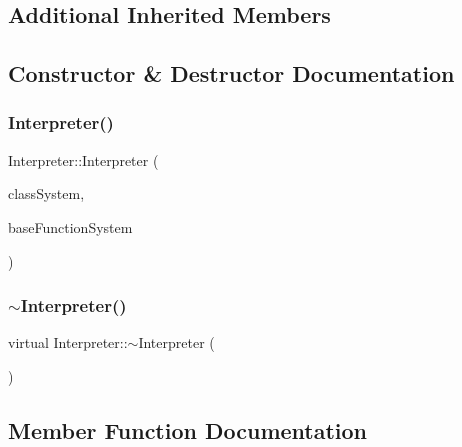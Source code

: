 \subsection*{Additional Inherited Members}


\subsection{Constructor \& Destructor Documentation}
\mbox{\label{classInterpreter_af4a885b059b6af440882047e8406bc9c}} 
\subsubsection{\texorpdfstring{Interpreter()}{Interpreter()}}
{\footnotesize\ttfamily Interpreter\+::\+Interpreter (\begin{DoxyParamCaption}\item[{\hyperlink{classClassSystem}{Class\+System} $\ast$}]{class\+System,  }\item[{\hyperlink{classFunctionSystem}{Function\+System} $\ast$}]{base\+Function\+System }\end{DoxyParamCaption})}

\mbox{\label{classInterpreter_a462a2467300903e0188ac6e4a6a612f6}} 
\subsubsection{\texorpdfstring{$\sim$\+Interpreter()}{~Interpreter()}}
{\footnotesize\ttfamily virtual Interpreter\+::$\sim$\+Interpreter (\begin{DoxyParamCaption}{ }\end{DoxyParamCaption})\hspace{0.3cm}{\ttfamily [virtual]}}



\subsection{Member Function Documentation}
\mbox{\label{classInterpreter_ab51bbc767ecf73aca9137b1a78406e20}} 
